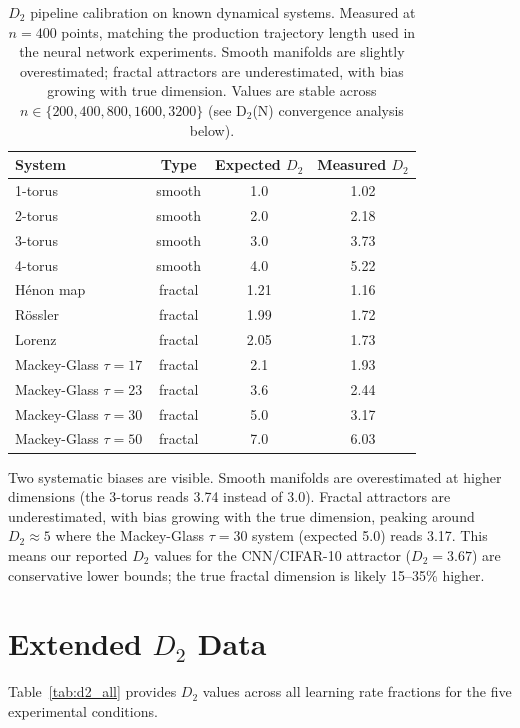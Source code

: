 \documentclass[aps,prl,twocolumn,superscriptaddress]{revtex4-2}
\begin{document}
\begin{table}[h]
\caption{\label{tab:calibration}%
$D_2$ pipeline calibration on known dynamical systems. Measured at $n=400$ points, matching the production trajectory length used in the neural network experiments. Smooth manifolds are slightly overestimated; fractal attractors are underestimated, with bias growing with true dimension. Values are stable across $n \in \{200, 400, 800, 1600, 3200\}$ (see D$_2$(N) convergence analysis below).}
\begin{ruledtabular}
\begin{tabular}{lccc}
System & Type & Expected $D_2$ & Measured $D_2$\\
\hline
1-torus & smooth & 1.0 & 1.02\\
2-torus & smooth & 2.0 & 2.18\\
3-torus & smooth & 3.0 & 3.73\\
4-torus & smooth & 4.0 & 5.22\\
H\'{e}non map & fractal & 1.21 & 1.16\\
R\"{o}ssler & fractal & 1.99 & 1.72\\
Lorenz & fractal & 2.05 & 1.73\\
Mackey-Glass $\tau{=}17$ & fractal & 2.1 & 1.93\\
Mackey-Glass $\tau{=}23$ & fractal & 3.6 & 2.44\\
Mackey-Glass $\tau{=}30$ & fractal & 5.0 & 3.17\\
Mackey-Glass $\tau{=}50$ & fractal & 7.0 & 6.03\\
\end{tabular}
\end{ruledtabular}
\end{table}

Two systematic biases are visible. Smooth manifolds are overestimated at higher dimensions (the 3-torus reads 3.74 instead of 3.0). Fractal attractors are underestimated, with bias growing with the true dimension, peaking around $D_2 \approx 5$ where the Mackey-Glass $\tau{=}30$ system (expected 5.0) reads 3.17. This means our reported $D_2$ values for the CNN/CIFAR-10 attractor ($D_2 = 3.67$) are conservative lower bounds; the true fractal dimension is likely 15--35\% higher.

\section{Extended $D_2$ Data}

Table~\ref{tab:d2_all} provides $D_2$ values across all learning rate fractions for the five experimental conditions.
\end{document}
